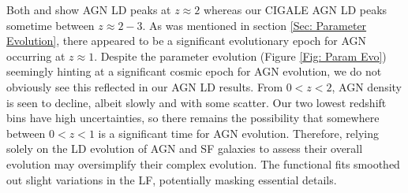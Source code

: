Both \cite{symeonidis_agn_2021} and \cite{delvecchio_tracing_2014} show AGN LD peaks at $z\approx2$ whereas our CIGALE AGN LD peaks sometime between $z\approx2-3$. As was mentioned in section \ref{Sec: Parameter Evolution}, there appeared to be a significant evolutionary epoch for AGN occurring at $z\approx1$. Despite the parameter evolution (Figure \ref{Fig: Param Evo}) seemingly hinting at a significant cosmic epoch for AGN evolution, we do not obviously see this reflected in our AGN LD results. From $0<z<2$, AGN density is seen to decline, albeit slowly and with some scatter. Our two lowest redshift bins have high uncertainties, so there remains the possibility that somewhere between $0<z<1$ is a significant time for AGN evolution. Therefore, relying solely on the LD evolution of AGN and SF galaxies to assess their overall evolution may oversimplify their complex evolution. The functional fits smoothed out slight variations in the LF, potentially masking essential details. 





